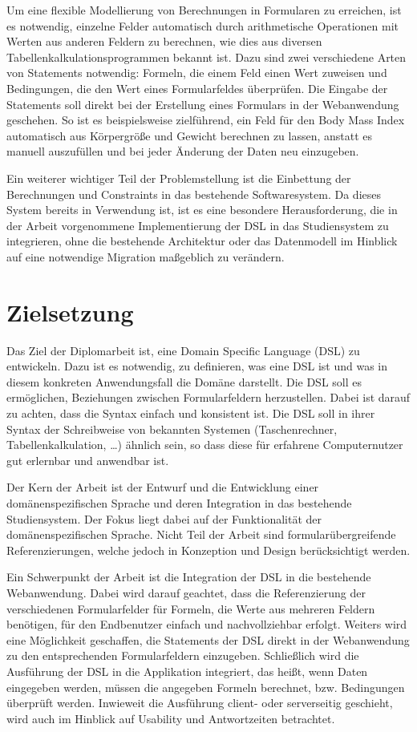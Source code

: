 Um eine flexible Modellierung von Berechnungen in Formularen zu er\-rei\-chen, ist es notwendig, einzelne Felder
automatisch durch arithmetische Operationen mit Werten aus anderen Feldern zu berechnen, wie dies aus diversen
Tabellenkalkulationsprogrammen bekannt ist. Dazu sind zwei verschiedene Arten von Statements notwendig:
Formeln, die einem Feld einen Wert zuweisen und Bedingungen, die den Wert eines Formularfeldes
über\-prü\-fen. Die Eingabe der Statements soll direkt bei der Erstellung eines Formulars in der Webanwendung
geschehen. So ist es beispielsweise zielführend, ein Feld für den Body Mass Index automatisch aus
Körpergröße und Gewicht berechnen zu lassen, anstatt es manuell auszufüllen und bei jeder Änderung der
Daten neu einzugeben.

Ein weiterer wichtiger Teil der Problemstellung ist die Einbettung der Berechnungen und Constraints in das
bestehende Softwaresystem. Da dieses System bereits in Verwendung ist, ist es eine besondere
Herausforderung, die in der Arbeit vorgenommene Implementierung der DSL in das Studiensystem zu integrieren,
ohne die bestehende Architektur oder das Datenmodell im Hinblick auf eine notwendige Migration
maßgeblich zu verändern.


\section{Zielsetzung}

Das Ziel der Diplomarbeit ist, eine Domain Specific Language (DSL) zu ent\-wick\-eln. Dazu ist es notwendig, zu definieren, was eine DSL
ist und was in diesem konkreten Anwendungsfall die Domäne darstellt. Die DSL soll es ermöglichen,
Beziehungen zwischen Formularfeldern herzustellen. Dabei ist darauf zu achten, dass die Syntax einfach
und konsistent ist. Die DSL soll in ihrer Syntax der Schreibweise von bekannten Systemen (Taschenrechner,
Tabellenkalkulation, …) ähnlich sein, so dass diese für erfahrene Computernutzer gut erlernbar und
anwendbar ist.

Der Kern der Arbeit ist der Entwurf und die Entwicklung einer do\-mä\-nen\-spe\-zi\-fi\-schen Sprache und deren
Integration in das bestehende Studiensystem. Der Fokus liegt dabei auf der Funktionalität der
domänenspezifischen Sprache. Nicht Teil der Arbeit sind formularübergreifende Referenzierungen, welche
jedoch in Konzeption und Design berücksichtigt werden. 

Ein Schwerpunkt der Arbeit ist die Integration der DSL in die bestehende Webanwendung. Dabei wird darauf
geachtet, dass die Referenzierung der verschiedenen Formularfelder für Formeln, die Werte aus
mehreren Feldern benötigen, für den Endbenutzer einfach und nachvollziehbar erfolgt. Weiters wird eine
Möglichkeit geschaffen, die Statements der DSL direkt in der Web\-an\-wen\-dung zu den
entsprechenden Formularfeldern einzugeben. Schließlich wird die Ausführung der DSL in die Applikation
integriert, das heißt, wenn Daten eingegeben werden, müssen die angegeben Formeln berechnet, bzw.
Bedingungen überprüft werden. Inwieweit die Ausführung client- oder serverseitig geschieht, wird auch im
Hinblick auf Usability und Antwortzeiten betrachtet.




